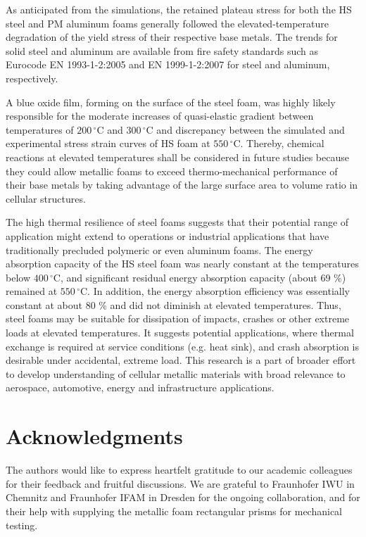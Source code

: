 \documentclass[review]{elsarticle}
\begin{document}
{As anticipated from the simulations, the retained plateau stress for both the HS steel and PM aluminum foams generally followed the elevated-temperature degradation of the yield stress of their respective base metals. The trends for solid steel and aluminum are available from fire safety standards such as Eurocode EN 1993-1-2:2005 and EN 1999-1-2:2007 for steel and aluminum, respectively. 

A blue oxide film, forming on the surface of the steel foam, was highly likely responsible for the moderate increases of quasi-elastic gradient between temperatures of $200\,^{\circ}\mathrm{C}$ and $300\,^{\circ}\mathrm{C}$ and discrepancy between the simulated and experimental stress strain curves of HS foam at $550\,^{\circ}\mathrm{C}$.  Thereby, chemical reactions at elevated temperatures shall be considered in future studies because they could allow metallic foams to exceed thermo-mechanical performance of their base metals by taking advantage of the large surface area to volume ratio in cellular structures.

The high thermal resilience of steel foams suggests that their potential range of application might extend to operations or industrial applications that have traditionally precluded polymeric or even aluminum foams. The energy absorption capacity of the HS steel foam was nearly constant at the temperatures below $400\,^{\circ}\mathrm{C}$, and significant residual energy absorption capacity (about 69 \%) remained at $550\,^{\circ}\mathrm{C}$. In addition, the energy absorption efficiency was essentially constant at about 80 \% and did not diminish at elevated temperatures. Thus, steel foams may be suitable for dissipation of impacts, crashes or other extreme loads at elevated temperatures. It suggests potential applications, where thermal exchange is required at service conditions (e.g. heat sink), and crash absorption is desirable under accidental, extreme load. This research is a part of broader effort to develop understanding of cellular metallic materials with broad relevance to aerospace, automotive, energy and infrastructure applications.

\section*{Acknowledgments}

The authors would like to express heartfelt gratitude to our academic colleagues for their feedback and fruitful discussions. We are grateful to Fraunhofer IWU in Chemnitz and Fraunhofer IFAM in Dresden for the ongoing collaboration, and for their help with supplying the metallic foam rectangular prisms for mechanical testing.

}
\end{document}
